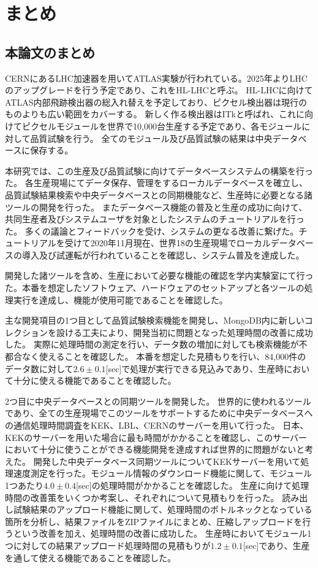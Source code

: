 \chapter{まとめ}

\section{本論文のまとめ}
CERNにあるLHC加速器を用いてATLAS実験が行われている。2025年よりLHCのアップグレードを行う予定であり、これをHL-LHCと呼ぶ。
HL-LHCに向けてATLAS内部飛跡検出器の総入れ替えを予定しており、ピクセル検出器は現行のものよりも広い範囲をカバーする。
新しく作る検出器はITkと呼ばれ、これに向けてピクセルモジュールを世界で10,000台生産する予定であり、各モジュールに対して品質試験を行う。
全てのモジュール及び品質試験の結果は中央データベースに保存する。

本研究では、この生産及び品質試験に向けてデータベースシステムの構築を行った。
各生産現場にてデータ保存、管理をするローカルデータベースを確立し、品質試験結果検索や中央データベースとの同期機能など、生産時に必要となる諸ツールの開発を行った。
またデータベース機能の普及と生産の成功に向けて、共同生産者及びシステムユーザを対象としたシステムのチュートリアルを行った。
多くの議論とフィードバックを受け、システムの更なる改善に繋げた。チュートリアルを受けて2020年11月現在、世界18の生産現場でローカルデータベースの導入及び試運転が行われていることを確認し、システム普及を達成した。

開発した諸ツールを含め、生産において必要な機能の確認を学内実験室にて行った。本番を想定したソフトウェア、ハードウェアのセットアップと各ツールの処理実行を達成し、機能が使用可能であることを確認した。

主な開発項目の1つ目として品質試験検索機能を開発し、MongoDB内に新しいコレクションを設ける工夫により、開発当初に問題となった処理時間の改善に成功した。
実際に処理時間の測定を行い、データ数の増加に対しても検索機能が不都合なく使えることを確認した。
本番を想定した見積もりを行い、84,000件のデータ数に対して$2.6\pm0.1$[sec]で処理が実行できる見込みであり、生産時において十分に使える機能であることを確認した。

2つ目に中央データベースとの同期ツールを開発した。
世界的に使われるツールであり、全ての生産現場でこのツールをサポートするために中央データベースへの通信処理時間調査をKEK、LBL、CERNのサーバーを用いて行った。
日本、KEKのサーバーを用いた場合に最も時間がかかることを確認し、このサーバーにおいて十分に使うことができる機能開発を達成すれば世界的に問題がないと考えた。
開発した中央データベース同期ツールについてKEKサーバーを用いて処理速度測定を行った。モジュール情報のダウンロード機能に関して、モジュール1つあたり$4.0\pm 0.4$[sec]の処理時間がかかることを確認した。
生産に向けて処理時間の改善策をいくつか考案し、それぞれについて見積もりを行った。
読み出し試験結果のアップロード機能に関して、処理時間のボトルネックとなっている箇所を分析し、結果ファイルをZIPファイルにまとめ、圧縮しアップロードを行うという改善を加え、処理時間の改善に成功した。
生産時においてモジュール1つに対しての結果アップロード処理時間の見積もりが$1.2\pm 0.1$[sec]であり、生産を通して使える機能であることを確認した。

